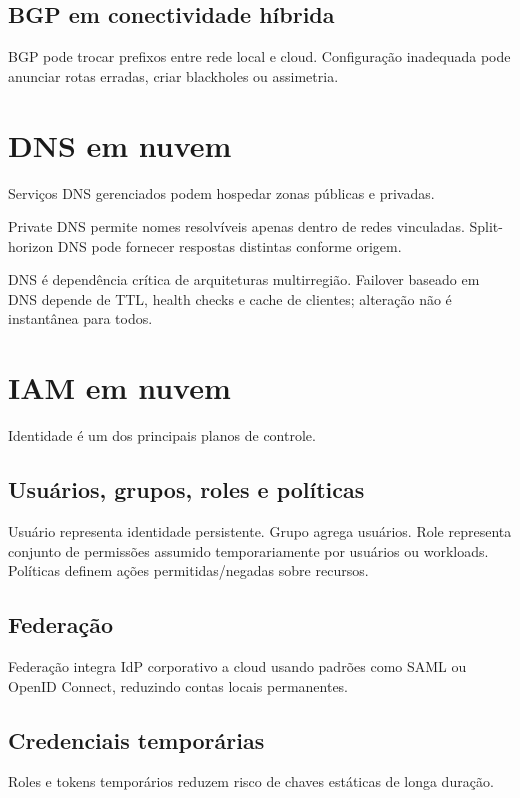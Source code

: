 \subsection{BGP em conectividade híbrida}

BGP pode trocar prefixos entre rede local e cloud. Configuração inadequada pode anunciar rotas erradas, criar blackholes ou assimetria.

\section{DNS em nuvem}

Serviços DNS gerenciados podem hospedar zonas públicas e privadas.

Private DNS permite nomes resolvíveis apenas dentro de redes vinculadas. Split-horizon DNS pode fornecer respostas distintas conforme origem.

DNS é dependência crítica de arquiteturas multirregião. Failover baseado em DNS depende de TTL, health checks e cache de clientes; alteração não é instantânea para todos.

\section{IAM em nuvem}

Identidade é um dos principais planos de controle.

\subsection{Usuários, grupos, roles e políticas}

Usuário representa identidade persistente. Grupo agrega usuários. Role representa conjunto de permissões assumido temporariamente por usuários ou workloads. Políticas definem ações permitidas/negadas sobre recursos.

\subsection{Federação}

Federação integra IdP corporativo a cloud usando padrões como SAML ou OpenID Connect, reduzindo contas locais permanentes.

\subsection{Credenciais temporárias}

Roles e tokens temporários reduzem risco de chaves estáticas de longa duração.

